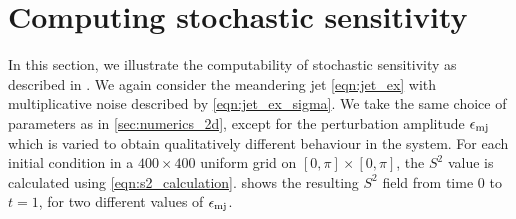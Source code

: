 \section{Computing stochastic sensitivity} \label{sec:comput_s2}
In this section, we illustrate the computability of stochastic sensitivity as described in .
We again consider the meandering jet \cref{eqn:jet_ex} with multiplicative noise described by \cref{eqn:jet_ex_sigma}.
We take the same choice of parameters as in \cref{sec:numerics_2d}, except for the perturbation amplitude \(\epsilon_{\mathrm{mj}}\) which is varied to obtain qualitatively different behaviour in the system.
For each initial condition in a \(400 \times 400\) uniform grid on \(\left[0, \pi\right] \times \left[0, \pi\right]\), the \(S^2\) value is calculated using \cref{eqn:s2_calculation}.
 shows the resulting \(S^2\) field from time \(0\) to \(t = 1\), for two different values of \(\epsilon_{\mathrm{mj}}\).

